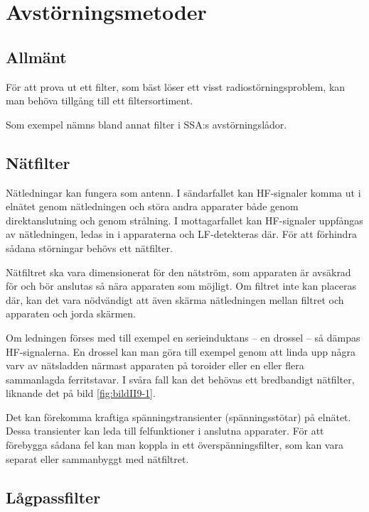 \section{Avstörningsmetoder}
\label{avstörning}

\subsection{Allmänt}
För att prova ut ett filter, som bäst löser ett visst radiostörningsproblem,
kan man behöva tillgång till ett filtersortiment.

Som exempel nämns bland annat filter i SSA:s avstörningslådor.

\subsection{Nätfilter}

Nätledningar kan fungera som antenn.
I sändarfallet kan HF-signaler komma ut i elnätet genom nätledningen och störa
andra apparater både genom direktanslutning och genom strålning.
I mottagarfallet kan HF-signaler uppfångas av nätledningen, ledas in i
apparaterna och LF-detekteras där.
För att förhindra sådana störningar behövs ett nätfilter.

Nätfiltret ska vara dimensionerat för den nätström, som apparaten är avsäkrad
för och bör anslutas så nära apparaten som möjligt.
Om filtret inte kan placeras där, kan det vara nödvändigt att även skärma
nätledningen mellan filtret och apparaten och jorda skärmen.


Om ledningen förses med till exempel en serieinduktans -- en drossel -- så dämpas
HF-signalerna.
En drossel kan man göra till exempel genom att linda upp några varv av nätsladden
närmast apparaten på toroider eller en eller flera sammanlagda ferritstavar.
I svåra fall kan det behövas ett bredbandigt nätfilter, liknande
det på bild \ref{fig:bildII9-1}.

Det kan förekomma kraftiga spänningstransienter (spänningsstötar) på elnätet.
Dessa transienter kan leda till felfunktioner i anslutna apparater.
För att förebygga sådana fel kan man koppla in ett överspänningsfilter, som kan
vara separat eller sammanbyggt med nätfiltret.

\subsection{Lågpassfilter}
\label{Lågpassfilter}

